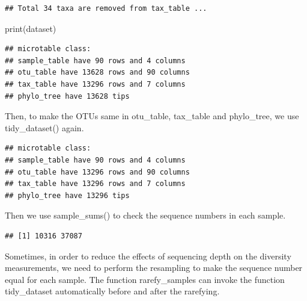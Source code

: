 \documentclass[
]{book}
\newenvironment{Shaded}{\begin{snugshade}}{\end{snugshade}}
\newcommand{\FunctionTok}[1]{\textcolor[rgb]{0.00,0.00,0.00}{#1}}
\newcommand{\NormalTok}[1]{#1}
\newcommand{\SpecialCharTok}[1]{\textcolor[rgb]{0.00,0.00,0.00}{#1}}
\begin{document}
\begin{verbatim}
## Total 34 taxa are removed from tax_table ...
\end{verbatim}

\begin{Shaded}
\begin{Highlighting}[]
\FunctionTok{print}\NormalTok{(dataset)}
\end{Highlighting}
\end{Shaded}

\begin{verbatim}
## microtable class:
## sample_table have 90 rows and 4 columns
## otu_table have 13628 rows and 90 columns
## tax_table have 13296 rows and 7 columns
## phylo_tree have 13628 tips
\end{verbatim}

Then, to make the OTUs same in otu\_table, tax\_table and phylo\_tree, we use tidy\_dataset() again.

\begin{Shaded}
\end{Shaded}

\begin{verbatim}
## microtable class:
## sample_table have 90 rows and 4 columns
## otu_table have 13296 rows and 90 columns
## tax_table have 13296 rows and 7 columns
## phylo_tree have 13296 tips
\end{verbatim}

Then we use sample\_sums() to check the sequence numbers in each sample.

\begin{Shaded}
\end{Shaded}

\begin{verbatim}
## [1] 10316 37087
\end{verbatim}

Sometimes, in order to reduce the effects of sequencing depth on the diversity measurements,
we need to perform the resampling to make the sequence number equal for each sample.
The function rarefy\_samples can invoke the function tidy\_dataset automatically before and after the rarefying.
\end{document}
